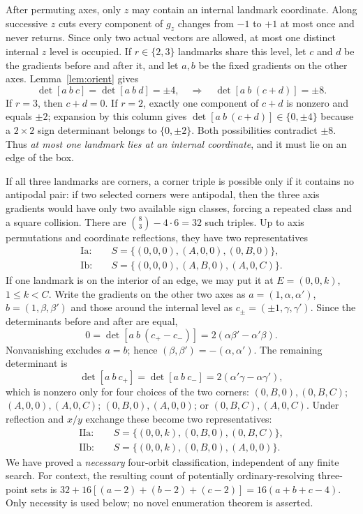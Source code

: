 \documentclass[10pt,a4paper]{article}
\begin{document}
After permuting axes, only $z$ may contain an internal landmark coordinate. Along successive $z$ cuts every component of $g_z$ changes from $-1$ to $+1$ at most once and never returns. Since only two actual vectors are allowed, at most one distinct internal $z$ level is occupied. If $r\in\{2,3\}$ landmarks share this level, let $c$ and $d$ be the gradients before and after it, and let $a,b$ be the fixed gradients on the other axes. Lemma~\ref{lem:orient} gives
\[\det[a\ b\ c]=\det[a\ b\ d]=\pm4,
\quad\Longrightarrow\quad \det[a\ b\ (c+d)]=\pm8.
\]
If $r=3$, then $c+d=0$. If $r=2$, exactly one component of $c+d$ is nonzero and equals $\pm2$; expansion by this column gives $\det[a\ b\ (c+d)]\in\{0,\pm4\}$ because a $2\times2$ sign determinant belongs to $\{0,\pm2\}$. Both possibilities contradict $\pm8$. Thus \emph{at most one landmark lies at an internal coordinate}, and it must lie on an edge of the box.

If all three landmarks are corners, a corner triple is possible only if it contains no antipodal pair: if two selected corners were antipodal, then the three axis gradients would have only two available sign classes, forcing a repeated class and a square collision. There are $\binom83-4\cdot6=32$ such triples. Up to axis permutations and coordinate reflections, they have two representatives
\begin{align*}
\mathrm{I\!a}:&\quad S=\{(0,0,0),(A,0,0),(0,B,0)\},\\
\mathrm{I\!b}:&\quad S=\{(0,0,0),(A,B,0),(A,0,C)\}.
\end{align*}
If one landmark is on the interior of an edge, we may put it at $E=(0,0,k)$, $1\le k<C$. Write the gradients on the other two axes as $a=(1,\alpha,\alpha')$, $b=(1,\beta,\beta')$ and those around the internal level as $c_{\pm}=(\pm1,\gamma,\gamma')$. Since the determinants before and after are equal,
\[0=\det[a\ b\ (c_+-c_-)]=2(\alpha\beta'-\alpha'\beta).\]
Nonvanishing excludes $a=b$; hence $(\beta,\beta')=-(\alpha,\alpha')$. The remaining determinant is
\[\det[a\ b\ c_+]=\det[a\ b\ c_-]=2(\alpha'\gamma-\alpha\gamma'),\]
which is nonzero only for four choices of the two corners: $(0,B,0),(0,B,C)$; $(A,0,0),(A,0,C)$; $(0,B,0),(A,0,0)$; or $(0,B,C),(A,0,C)$. Under reflection and $x/y$ exchange these become two representatives:
\begin{align*}
\mathrm{II\!a}:&\quad S=\{(0,0,k),(0,B,0),(0,B,C)\},\\
\mathrm{II\!b}:&\quad S=\{(0,0,k),(0,B,0),(A,0,0)\}.
\end{align*}
We have proved a \emph{necessary} four-orbit classification, independent of any finite search. For context, the resulting count of potentially ordinary-resolving three-point sets is $32+16[(a-2)+(b-2)+(c-2)]=16(a+b+c-4)$. Only necessity is used below; no novel enumeration theorem is asserted.
\end{document}
